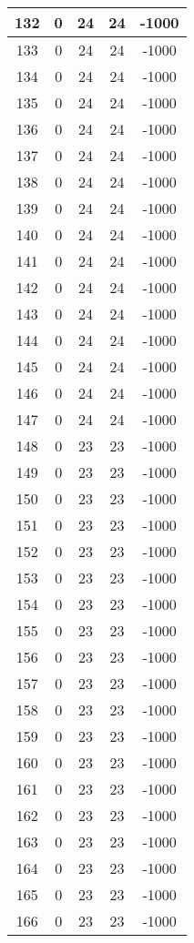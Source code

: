 \documentclass[letterpaper, 12pt]{article}
\begin{document}
\begin{longtable}{|c|c|c|c|c|}
\hline
132 & 0 & 24 & 24 & -1000 \\
\hline
133 & 0 & 24 & 24 & -1000 \\
\hline
134 & 0 & 24 & 24 & -1000 \\
\hline
135 & 0 & 24 & 24 & -1000 \\
\hline
136 & 0 & 24 & 24 & -1000 \\
\hline
137 & 0 & 24 & 24 & -1000 \\
\hline
138 & 0 & 24 & 24 & -1000 \\
\hline
139 & 0 & 24 & 24 & -1000 \\
\hline
140 & 0 & 24 & 24 & -1000 \\
\hline
141 & 0 & 24 & 24 & -1000 \\
\hline
142 & 0 & 24 & 24 & -1000 \\
\hline
143 & 0 & 24 & 24 & -1000 \\
\hline
144 & 0 & 24 & 24 & -1000 \\
\hline
145 & 0 & 24 & 24 & -1000 \\
\hline
146 & 0 & 24 & 24 & -1000 \\
\hline
147 & 0 & 24 & 24 & -1000 \\
\hline
148 & 0 & 23 & 23 & -1000 \\
\hline
149 & 0 & 23 & 23 & -1000 \\
\hline
150 & 0 & 23 & 23 & -1000 \\
\hline
151 & 0 & 23 & 23 & -1000 \\
\hline
152 & 0 & 23 & 23 & -1000 \\
\hline
153 & 0 & 23 & 23 & -1000 \\
\hline
154 & 0 & 23 & 23 & -1000 \\
\hline
155 & 0 & 23 & 23 & -1000 \\
\hline
156 & 0 & 23 & 23 & -1000 \\
\hline
157 & 0 & 23 & 23 & -1000 \\
\hline
158 & 0 & 23 & 23 & -1000 \\
\hline
159 & 0 & 23 & 23 & -1000 \\
\hline
160 & 0 & 23 & 23 & -1000 \\
\hline
161 & 0 & 23 & 23 & -1000 \\
\hline
162 & 0 & 23 & 23 & -1000 \\
\hline
163 & 0 & 23 & 23 & -1000 \\
\hline
164 & 0 & 23 & 23 & -1000 \\
\hline
165 & 0 & 23 & 23 & -1000 \\
\hline
166 & 0 & 23 & 23 & -1000 \\

\end{longtable}
\end{document}
